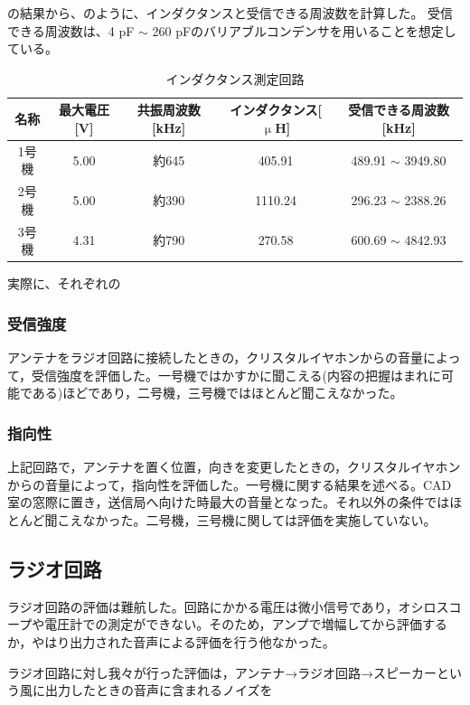 \documentclass[report.tex]{subfiles}
\begin{document}
の結果から、のように、インダクタンスと受信できる周波数を計算した。
受信できる周波数は、4 pF \(\sim\) 260 pFのバリアブルコンデンサを用いることを想定している。

\begin{table}[h]
	\centering
	\caption{インダクタンス測定回路}
	\label{tab:ant2}
	\begin{tabular}{ccccc} \hline
		名称  & 最大電圧[V] & 共振周波数[kHz] & インダクタンス[\(\upmu\)H] & 受信できる周波数[kHz]           \\ \hline
		1号機 & 5.00    & 約645       & 405.91              & 489.91 \(\sim\) 3949.80 \\
		2号機 & 5.00    & 約390       & 1110.24             & 296.23 \(\sim\) 2388.26 \\
		3号機 & 4.31    & 約790       & 270.58              & 600.69 \(\sim\) 4842.93 \\ \hline
	\end{tabular}
\end{table}

実際に、それぞれの

\subsubsection{受信強度}
アンテナをラジオ回路に接続したときの，クリスタルイヤホンからの音量によって，受信強度を評価した。一号機ではかすかに聞こえる(内容の把握はまれに可能である)ほどであり，二号機，三号機ではほとんど聞こえなかった。
\subsubsection{指向性}
上記回路で，アンテナを置く位置，向きを変更したときの，クリスタルイヤホンからの音量によって，指向性を評価した。一号機に関する結果を述べる。CAD室の窓際に置き，送信局へ向けた時最大の音量となった。それ以外の条件ではほとんど聞こえなかった。二号機，三号機に関しては評価を実施していない。

\subsection{ラジオ回路}
ラジオ回路の評価は難航した。回路にかかる電圧は微小信号であり，オシロスコープや電圧計での測定ができない。そのため，アンプで増幅してから評価するか，やはり出力された音声による評価を行う他なかった。

ラジオ回路に対し我々が行った評価は，アンテナ→ラジオ回路→スピーカーという風に出力したときの音声に含まれるノイズを
\end{document}
